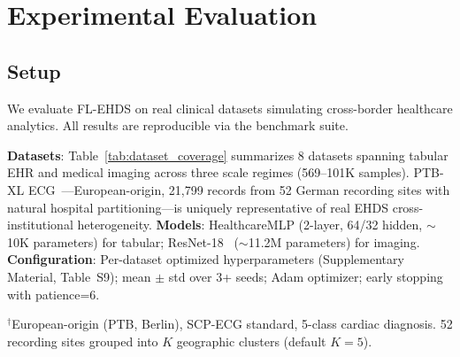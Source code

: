 \documentclass[conference,letterpaper]{IEEEtran}
\begin{document}
\section{Experimental Evaluation}
\label{sec:experiments}

\subsection{Setup}

We evaluate FL-EHDS on real clinical datasets simulating cross-border healthcare analytics. All results are reproducible via the benchmark suite.

\textbf{Datasets}: Table~\ref{tab:dataset_coverage} summarizes 8 datasets spanning tabular EHR and medical imaging across three scale regimes (569--101K samples). PTB-XL ECG~\cite{wagner2020ptbxl}---European-origin, 21,799 records from 52 German recording sites with natural hospital partitioning---is uniquely representative of real EHDS cross-institutional heterogeneity. \textbf{Models}: HealthcareMLP (2-layer, 64/32 hidden, $\sim$10K parameters) for tabular; ResNet-18~\cite{he2016deep} ($\sim$11.2M parameters) for imaging. \textbf{Configuration}: Per-dataset optimized hyperparameters (Supplementary Material, Table~S9); mean $\pm$ std over 3+ seeds; Adam optimizer; early stopping with patience=6.

\begin{table}[htbp]
\centering
\caption{Evaluated Dataset Coverage}
\label{tab:dataset_coverage}

\vspace{1mm}
\footnotesize{$^\dagger$European-origin (PTB, Berlin), SCP-ECG standard, 5-class cardiac diagnosis. 52 recording sites grouped into $K$ geographic clusters (default $K{=}5$).}
\end{table}
\end{document}
